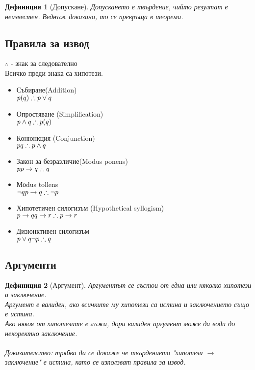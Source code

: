 \documentclass[fleqn, 12pt]{article}
\newtheorem{definition}{Дефиниция}[subsection]
\begin{document}
\begin{definition}[Допускане]
Допускането е твърдение, чийто резултат е неизвестен. Веднъж доказано, то се превръща в теорема. 
\end{definition}

\subsection{Правила за извод}
$\therefore$ - знак за следователно\\
Всичко преди знака са хипотези. 
\begin{itemize}
	\item Събиране(Addition) \\ $p (q) \\ \therefore p\lor q$
	\item Опростяване (Simplification) \\$p\land q \\ \therefore p(q)$
	\item Конюнкция (Conjunction) \\$p \\ q\\ \therefore p\land q$
	\item Закон за безразличие(Modus ponens) \\ $p \\ p \rightarrow q \\ \therefore q$
	\item Моdus tollens \\$\neg q \\ p \rightarrow q \\ \therefore \neg p$
	\item Хипотетичен силогизъм (Hypothetical syllogism) \\$ p \rightarrow q \\ q \rightarrow r \\ \therefore p \rightarrow r $
	\item Дизюнктивен силогизъм \\ $p\lor q \\ \neg p \\ \therefore q$
\end{itemize}

\subsection{Аргументи}

\begin{definition}[Аргумент]
Аргументът се състои от една или няколко хипотези и заключение. \\
Аргумент е валиден, ако всичките му хипотези са истина и заключението също е истина. \\
Ако някоя от хипотезите е лъжа, дори валиден аргумент може да води до некоректно заключение. \\
\\
Доказателство: трябва да се докаже че твърдението "хипотези $\rightarrow$ заключение" е истина, като се използват правила за извод. 
\end{definition}
\end{document}
